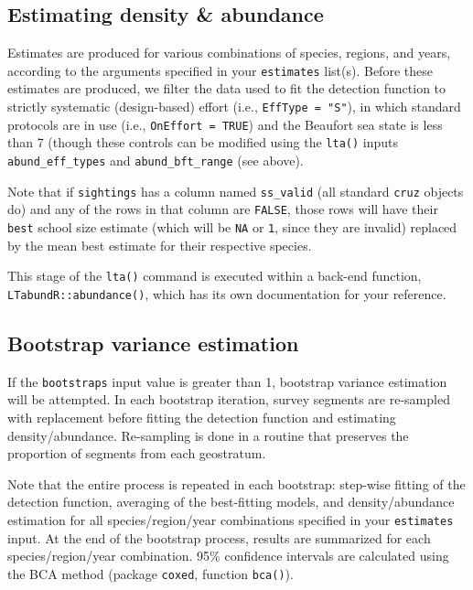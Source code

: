 \documentclass[
]{book}
\begin{document}
\hypertarget{estimating-density-abundance}{%
\subsection*{Estimating density \& abundance}\label{estimating-density-abundance}}

Estimates are produced for various combinations of species, regions, and years, according to the arguments specified in your \texttt{estimates} list(s). Before these estimates are produced, we filter the data used to fit the detection function to strictly systematic (design-based) effort (i.e., \texttt{EffType\ =\ "S"}), in which standard protocols are in use (i.e., \texttt{OnEffort\ =\ TRUE}) and the Beaufort sea state is less than 7 (though these controls can be modified using the \texttt{lta()} inputs \texttt{abund\_eff\_types} and \texttt{abund\_bft\_range} (see above).

Note that if \texttt{sightings} has a column named \texttt{ss\_valid} (all standard \texttt{cruz} objects do) and any of the rows in that column are \texttt{FALSE}, those rows will have their \texttt{best} school size estimate (which will be \texttt{NA} or \texttt{1}, since they are invalid) replaced by the mean best estimate for their respective species.

This stage of the \texttt{lta()} command is executed within a back-end function, \texttt{LTabundR::abundance()}, which has its own documentation for your reference.

\hypertarget{bootstrap-variance-estimation}{%
\subsection*{Bootstrap variance estimation}\label{bootstrap-variance-estimation}}

If the \texttt{bootstraps} input value is greater than 1, bootstrap variance estimation will be attempted. In each bootstrap iteration, survey segments are re-sampled with replacement before fitting the detection function and estimating density/abundance. Re-sampling is done in a routine that preserves the proportion of segments from each geostratum.

Note that the entire process is repeated in each bootstrap: step-wise fitting of the detection function, averaging of the best-fitting models, and density/abundance estimation for all species/region/year combinations specified in your \texttt{estimates} input. At the end of the bootstrap process, results are summarized for each species/region/year combination. 95\% confidence intervals are calculated using the BCA method (package \texttt{coxed}, function \texttt{bca()}).
\end{document}
